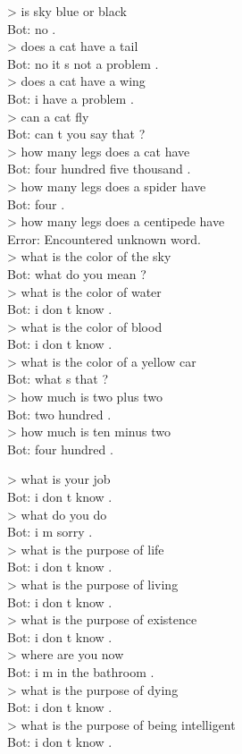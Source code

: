 \begin{displayquote}
    > is sky blue or black \\
    Bot: no . \\
    > does a cat have a tail \\
    Bot: no it s not a problem . \\
    > does a cat have a wing \\
    Bot: i have a problem . \\
    > can a cat fly \\
    Bot: can t you say that ? \\
    > how many legs does a cat have \\
    Bot: four hundred five thousand . \\
    > how many legs does a spider have \\
    Bot: four . \\
    > how many legs does a centipede have \\
    Error: Encountered unknown word. \\
    > what is the color of the sky \\
    Bot: what do you mean ? \\
    > what is the color of water \\
    Bot: i don t know . \\
    > what is the color of blood \\
    Bot: i don t know . \\
    > what is the color of a yellow car \\
    Bot: what s that ? \\
    > how much is two plus two \\
    Bot: two hundred . \\
    > how much is ten minus two \\
    Bot: four hundred . \\
\end{displayquote}

\begin{displayquote}
    > what is your job \\
    Bot: i don t know . \\
    > what do you do \\
    Bot: i m sorry . \\
    > what is the purpose of life \\
    Bot: i don t know . \\
    > what is the purpose of living \\
    Bot: i don t know . \\
    > what is the purpose of existence \\
    Bot: i don t know . \\
    > where are you now \\
    Bot: i m in the bathroom . \\
    > what is the purpose of dying \\
    Bot: i don t know . \\
    > what is the purpose of being intelligent \\
    Bot: i don t know . \\
\end{displayquote}

